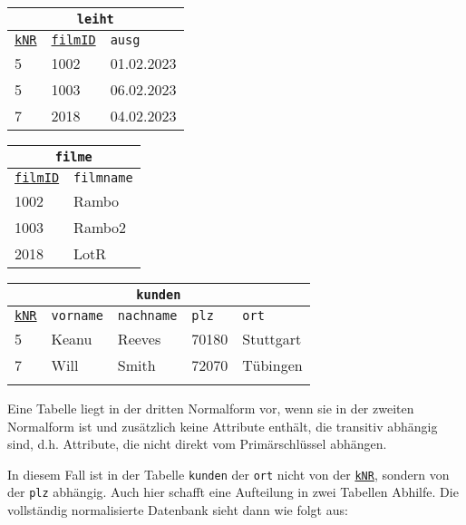 \begin{minipage}{\textwidth}
	\begin{minipage}{0.3\textwidth}
		\begin{tabular}{lll}
			\multicolumn{3}{c}{\lstinline!leiht!}\\
			\hline
			\underline{\lstinline!kNR!}&\underline{\lstinline!filmID!}&\lstinline!ausg!\\
			\hline
			5&1002&01.02.2023\\
			5&1003&06.02.2023\\
			7&2018&04.02.2023\\
		\end{tabular}
	\end{minipage}
	\begin{minipage}{0.228\textwidth}
		\begin{tabular}{ll}
			\multicolumn{2}{c}{\lstinline!filme!}\\
			\hline
			\underline{\lstinline!filmID!}&\lstinline!filmname!\\
			\hline
			1002&Rambo\\
			1003&Rambo2\\
			2018&LotR\\
		\end{tabular}
	\end{minipage}
	\begin{minipage}{0.472\textwidth}
		\begin{tabular}{lllll}
			\multicolumn{5}{c}{\lstinline!kunden!}\\
			\hline
			\underline{\lstinline!kNR!}&\lstinline!vorname!&\lstinline!nachname!&\lstinline!plz!&\lstinline!ort!\\
			\hline
			5&Keanu&Reeves&70180&Stuttgart\\
			7&Will&Smith&72070&Tübingen\\
			\phantom{0}&&&&\\
		\end{tabular}
	\end{minipage}
\end{minipage}
\begin{tcolorbox}[title=Dritte Normalform]
	Eine Tabelle liegt in der dritten Normalform vor, wenn sie in der zweiten Normalform ist und zusätzlich keine Attribute enthält, die transitiv abhängig sind, d.h. Attribute, die nicht direkt vom Primärschlüssel abhängen.
\end{tcolorbox}
In diesem Fall ist in der Tabelle \lstinline!kunden! der \lstinline!ort! nicht von der \underline{\lstinline!kNR!}, sondern von der \lstinline!plz! abhängig. Auch hier schafft eine Aufteilung in zwei Tabellen Abhilfe. Die vollständig normalisierte Datenbank sieht dann wie folgt aus:
